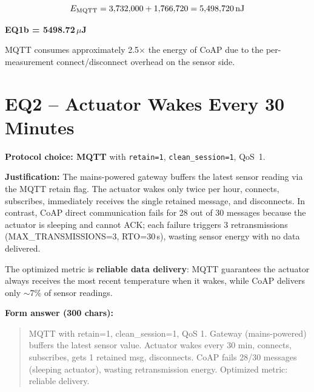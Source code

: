 \documentclass[12pt,a4paper]{article}
\begin{document}
\[
E_{\text{MQTT}} = 3{,}732{,}000 + 1{,}766{,}720 = 5{,}498{,}720 \text{\,nJ}
\]

\textbf{EQ1b = 5498.72\,\boldmath$\mu$J}

\bigskip
MQTT consumes approximately 2.5$\times$ the energy of CoAP due to
the per-measurement connect/disconnect overhead on the sensor side.

\section{EQ2 -- Actuator Wakes Every 30 Minutes}

\textbf{Protocol choice: MQTT} with \texttt{retain=1}, \texttt{clean\_session=1}, QoS~1.

\textbf{Justification:} The mains-powered gateway buffers the latest sensor reading
via the MQTT retain flag. The actuator wakes only twice per hour, connects,
subscribes, immediately receives the single retained message, and disconnects.
In contrast, CoAP direct communication fails for 28 out of 30 messages because
the actuator is sleeping and cannot ACK; each failure triggers 3 retransmissions
(MAX\_TRANSMISSIONS=3, RTO=30\,s), wasting sensor energy with no data delivered.

The optimized metric is \textbf{reliable data delivery}: MQTT guarantees the actuator
always receives the most recent temperature when it wakes, while CoAP delivers
only $\sim$7\% of sensor readings.

\textbf{Form answer (300 chars):}
\begin{quote}
\small
MQTT with retain=1, clean\_session=1, QoS 1. Gateway (mains-powered) buffers the latest sensor value. Actuator wakes every 30 min, connects, subscribes, gets 1 retained msg, disconnects. CoAP fails 28/30 messages (sleeping actuator), wasting retransmission energy. Optimized metric: reliable delivery.
\end{quote}
\end{document}
